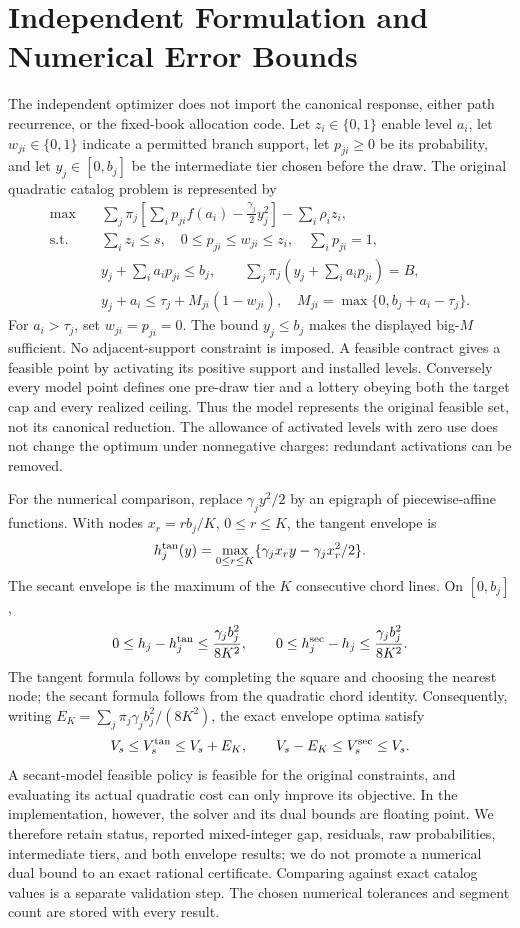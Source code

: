 \section{Independent Formulation and Numerical Error Bounds}\label{ec:r45-mip}
The independent optimizer does not import the canonical response, either path recurrence, or the fixed-book allocation code. Let $z_i\in\{0,1\}$ enable level $a_i$, let $w_{ji}\in\{0,1\}$ indicate a permitted branch support, let $p_{ji}\geq0$ be its probability, and let $y_j\in[0,b_j]$ be the intermediate tier chosen before the draw. The original quadratic catalog problem is represented by
\begin{align}
 \max\quad&\sum_j\pi_j\left[\sum_i p_{ji}f(a_i)-\frac{\gamma_j}{2}y_j^2\right]-\sum_i\rho_i z_i,\label{eq:r45-mip-obj}\\
 \text{s.t.}\quad&\sum_i z_i\leq s,\quad 0\leq p_{ji}\leq w_{ji}\leq z_i,\quad\sum_i p_{ji}=1,\label{eq:r45-mip-open}\\
 &y_j+\sum_i a_i p_{ji}\leq b_j,\qquad
 \sum_j\pi_j\left(y_j+\sum_i a_i p_{ji}\right)=B,\label{eq:r45-mip-promise}\\
 &y_j+a_i\leq\tau_j+M_{ji}(1-w_{ji}),\quad
 M_{ji}=\max\{0,b_j+a_i-\tau_j\}.\label{eq:r45-mip-risk}
\end{align}
For $a_i>\tau_j$, set $w_{ji}=p_{ji}=0$. The bound $y_j\leq b_j$ makes the displayed big-$M$ sufficient. No adjacent-support constraint is imposed. A feasible contract gives a feasible point by activating its positive support and installed levels. Conversely every model point defines one pre-draw tier and a lottery obeying both the target cap and every realized ceiling. Thus the model represents the original feasible set, not its canonical reduction. The allowance of activated levels with zero use does not change the optimum under nonnegative charges: redundant activations can be removed.

For the numerical comparison, replace $\gamma_jy^2/2$ by an epigraph of piecewise-affine functions. With nodes $x_r=rb_j/K$, $0\leq r\leq K$, the tangent envelope is
\[
 h_j^{\rm tan}(y)=\max_{0\leq r\leq K}\{\gamma_jx_ry-\gamma_jx_r^2/2\}.
\]
The secant envelope is the maximum of the $K$ consecutive chord lines. On $[0,b_j]$,
\[
 0\leq h_j-h_j^{\rm tan}\leq\frac{\gamma_jb_j^2}{8K^2},
 \qquad 0\leq h_j^{\rm sec}-h_j\leq\frac{\gamma_jb_j^2}{8K^2}.
\]
The tangent formula follows by completing the square and choosing the nearest node; the secant formula follows from the quadratic chord identity. Consequently, writing $E_K=\sum_j\pi_j\gamma_jb_j^2/(8K^2)$, the exact envelope optima satisfy
\[
 V_s\leq V_s^{\rm tan}\leq V_s+E_K,
 \qquad V_s-E_K\leq V_s^{\rm sec}\leq V_s.
\]
A secant-model feasible policy is feasible for the original constraints, and evaluating its actual quadratic cost can only improve its objective. In the implementation, however, the solver and its dual bounds are floating point. We therefore retain status, reported mixed-integer gap, residuals, raw probabilities, intermediate tiers, and both envelope results; we do not promote a numerical dual bound to an exact rational certificate. Comparing against exact catalog values is a separate validation step. The chosen numerical tolerances and segment count are stored with every result.

